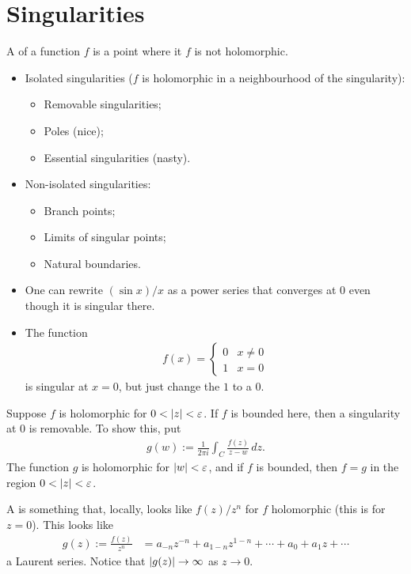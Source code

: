 \documentclass[11pt, oneside,margin=1in]{article}
\begin{document}
\section{Singularities}
A  of a function $f$ is a point where it $f$ is not holomorphic.
\begin{itemize}
	\item Isolated singularities ($f$ is holomorphic in a neighbourhood of the singularity):
		\begin{itemize}
			\item Removable singularities;
			\item Poles (nice);
			\item Essential singularities (nasty).
		\end{itemize}
	\item Non-isolated singularities:
		\begin{itemize}
			\item Branch points;
			\item Limits of singular points;
			\item Natural boundaries.
		\end{itemize}
\end{itemize}

\begin{example}\label{}\text{}
\begin{itemize}
	\item One can rewrite $(\sin x)/x$ as a power series that converges at $0$ even though it is singular there.
	\item The function
		\begin{align*}
			f(x) = \begin{cases}
				0 &x\ne 0\\
				1 & x=0
			\end{cases}
		\end{align*}
		is singular at $x=0$, but just change the $1$ to a $0$.
\end{itemize}
Suppose $f$ is holomorphic for $0<\left \lvert z \right \rvert <\varepsilon$. If $f$ is bounded here, then a singularity at $0$ is removable. To show this, put
\begin{align*}
	g(w) := \frac{1}{2\pi i} \int_C \frac{f (z)}{z-w} \, dz.
\end{align*}
The function $g$ is holomorphic for $\left \lvert w \right \rvert < \varepsilon$, and if $f$ is bounded, then $f=g$ in the region $0<\left \lvert z \right \rvert <\varepsilon$.
\end{example}

A  is something that, locally, looks like $f(z)/z^n$ for $f$ holomorphic (this is for $z=0$). This looks like
 \begin{align*}
	g(z):= \frac{f(z)}{z^n} &= a_{-n}z^{-n} + a_{1-n}z^{1-n} + \cdots + a_0 + a_1z + \cdots
\end{align*}
a Laurent series. Notice that $\left \lvert g(z) \right \rvert \to\infty $ as $z\to 0$. 
\end{document}
